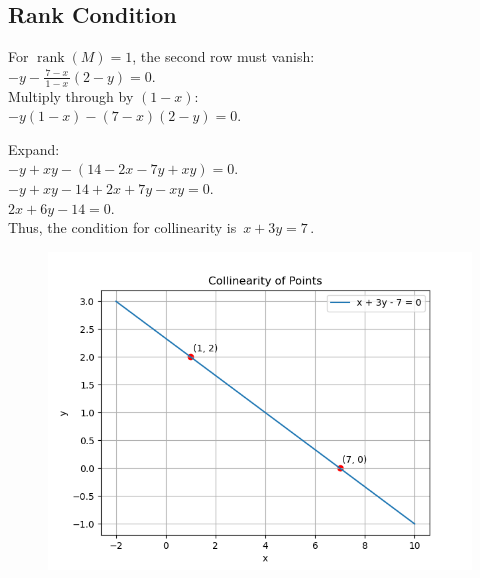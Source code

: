 \documentclass[journal]{IEEEtran}
\begin{document}
\subsection*{Rank Condition}

For $\operatorname{rank}(M)=1$, the second row must vanish:
\\

$
-y - \frac{7-x}{\,1-x\,}(2-y) = 0.
$
\\

Multiply through by $(1-x)$:
\\

$
-y(1-x) - (7-x)(2-y) = 0.
$

Expand:
\\

$
- y + xy - (14 - 2x - 7y + xy) = 0.
$
\\

$
- y + xy - 14 + 2x + 7y - xy = 0.
$
\\

$
2x + 6y - 14 = 0.
$
\\

Thus, the condition for collinearity is
$
\boxed{\,x + 3y = 7\,}.
$

\pagebreak

\begin{figure}[h]
\centering
\includegraphics[width=0.7\columnwidth]{figs/fig1.png}
\caption{}
\label{}
\end{figure}
\end{document}

